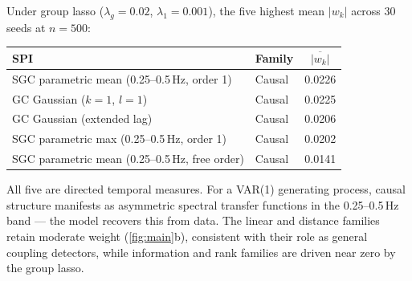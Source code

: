 \documentclass{article}
\begin{document}
Under group lasso ($\lambda_g{=}0.02$, $\lambda_1{=}0.001$), the five highest mean $|w_k|$ across 30 seeds at $n{=}500$:

\begin{table}[h]
\begin{center}
\begin{small}
\begin{tabular}{llc}
\toprule
SPI & Family & $\overline{|w_k|}$ \\
\midrule
SGC parametric mean (0.25--0.5\,Hz, order 1) & Causal & 0.0226 \\
GC Gaussian ($k{=}1$, $l{=}1$) & Causal & 0.0225 \\
GC Gaussian (extended lag) & Causal & 0.0206 \\
SGC parametric max (0.25--0.5\,Hz, order 1) & Causal & 0.0202 \\
SGC parametric mean (0.25--0.5\,Hz, free order) & Causal & 0.0141 \\
\bottomrule
\end{tabular}
\end{small}
\end{center}
\end{table}

All five are directed temporal measures. For a VAR(1) generating process, causal structure manifests as asymmetric spectral transfer functions in the 0.25--0.5\,Hz band --- the model recovers this from data. The linear and distance families retain moderate weight (\cref{fig:main}b), consistent with their role as general coupling detectors, while information and rank families are driven near zero by the group lasso.
\end{document}
